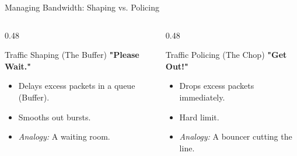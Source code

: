 \documentclass[aspectratio=169]{beamer}  %
\begin{document}
\begin{frame}{Managing Bandwidth: Shaping vs. Policing}
    \begin{columns}[T]
        \begin{column}{0.48\textwidth}
            \begin{block}{Traffic Shaping (The Buffer)}
                \footnotesize
                \textbf{"Please Wait."}
                \begin{itemize}
                    \item Delays excess packets in a queue (Buffer).
                    \item Smooths out bursts.
                    \item \textit{Analogy:} A waiting room.
                \end{itemize}
            \end{block}
            \begin{center}
            \end{center}
        \end{column}
        \begin{column}{0.48\textwidth}
            \begin{block}{Traffic Policing (The Chop)}
                \footnotesize
                \textbf{"Get Out!"}
                \begin{itemize}
                    \item Drops excess packets immediately.
                    \item Hard limit.
                    \item \textit{Analogy:} A bouncer cutting the line.
                \end{itemize}
            \end{block}
            \begin{center}
            \end{center}
        \end{column}
    \end{columns}
\end{frame}
\end{document}
